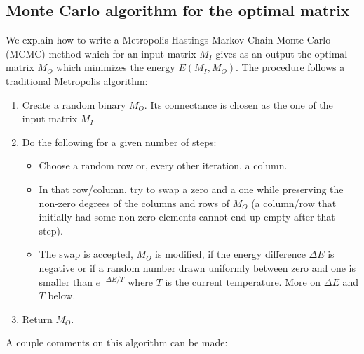 \documentclass[12pt, titlepage]{report}
\begin{document}
\subsection{Monte Carlo algorithm for the optimal matrix} \label{section: methods general MC solver}
We explain how to write a Metropolis-Hastings Markov Chain Monte Carlo (MCMC) method which for an input matrix $M_I$ gives as an output the optimal matrix $M_O$ which minimizes the energy $E(M_I, M_O)$. The procedure follows a traditional Metropolis algorithm:
\begin{enumerate}
\item Create a random binary $M_O$. Its connectance is chosen as the one of the input matrix $M_I$.
\item Do the following for a given number of steps:
\begin{itemize}
\item Choose a random row or, every other iteration, a column.
\item In that row/column, try to swap a zero and a one while preserving the %
non-zero degrees of the columns and rows of $M_O$ (a column/row that initially had some non-zero elements cannot end up empty after that step).
\item The swap is accepted, \ie $M_O$ is modified, if the energy difference $\Delta E$ is negative or if a random number drawn uniformly between zero and one is smaller than $e^{-\Delta E/T}$ where $T$ is the current temperature. More on $\Delta E$ and $T$ below.
\end{itemize}
\item Return $M_O$.
\end{enumerate}
A couple comments on this algorithm can be made:
\end{document}
